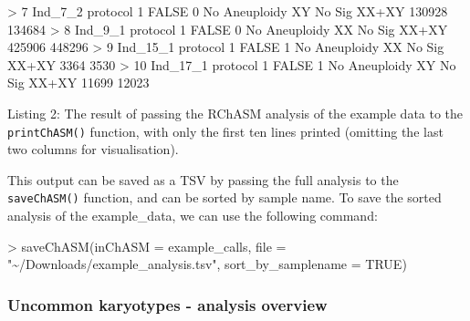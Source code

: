 \documentclass[
  letterpaper,
  DIV=11,
  numbers=noendperiod]{scrartcl}
\newenvironment{Shaded}{\begin{snugshade}}{\end{snugshade}}
\newcommand{\AttributeTok}[1]{\textcolor[rgb]{0.40,0.45,0.13}{#1}}
\newcommand{\ConstantTok}[1]{\textcolor[rgb]{0.56,0.35,0.01}{#1}}
\newcommand{\DecValTok}[1]{\textcolor[rgb]{0.68,0.00,0.00}{#1}}
\newcommand{\FunctionTok}[1]{\textcolor[rgb]{0.28,0.35,0.67}{#1}}
\newcommand{\NormalTok}[1]{\textcolor[rgb]{0.00,0.23,0.31}{#1}}
\newcommand{\SpecialCharTok}[1]{\textcolor[rgb]{0.37,0.37,0.37}{#1}}
\newcommand{\StringTok}[1]{\textcolor[rgb]{0.13,0.47,0.30}{#1}}
\begin{document}
\begin{Shaded}
\begin{Highlighting}[]
\SpecialCharTok{\textgreater{}}  \DecValTok{7}\NormalTok{ Ind\_7\_2  protocol }\DecValTok{1} \ConstantTok{FALSE}       \DecValTok{0}\NormalTok{ No Aneuploidy  XY       No Sig XX}\SpecialCharTok{+}\NormalTok{XY          }\DecValTok{130928}    \DecValTok{134684}
\SpecialCharTok{\textgreater{}}  \DecValTok{8}\NormalTok{ Ind\_9\_1  protocol }\DecValTok{1} \ConstantTok{FALSE}       \DecValTok{0}\NormalTok{ No Aneuploidy  XX       No Sig XX}\SpecialCharTok{+}\NormalTok{XY          }\DecValTok{425906}    \DecValTok{448296}
\SpecialCharTok{\textgreater{}}  \DecValTok{9}\NormalTok{ Ind\_15\_1 protocol }\DecValTok{1} \ConstantTok{FALSE}       \DecValTok{1}\NormalTok{ No Aneuploidy  XX       No Sig XX}\SpecialCharTok{+}\NormalTok{XY            }\DecValTok{3364}      \DecValTok{3530}
\SpecialCharTok{\textgreater{}} \DecValTok{10}\NormalTok{ Ind\_17\_1 protocol }\DecValTok{1} \ConstantTok{FALSE}       \DecValTok{1}\NormalTok{ No Aneuploidy  XY       No Sig XX}\SpecialCharTok{+}\NormalTok{XY           }\DecValTok{11699}     \DecValTok{12023}
\end{Highlighting}
\end{Shaded}

\normalsize

Listing 2: The result of passing the RChASM analysis of the example data
to the \texttt{printChASM()} function, with only the first ten lines
printed (omitting the last two columns for
visualisation)\label{fig:printChasmOutput}.

This output can be saved as a TSV by passing the full analysis to the
\texttt{saveChASM()} function, and can be sorted by sample name. To save
the sorted analysis of the example\_data, we can use the following
command:

\begin{Shaded}
\begin{Highlighting}[]
\SpecialCharTok{\textgreater{}} \FunctionTok{saveChASM}\NormalTok{(}\AttributeTok{inChASM =}\NormalTok{ example\_calls, }
            \AttributeTok{file =} \StringTok{"\textasciitilde{}/Downloads/example\_analysis.tsv"}\NormalTok{, }
            \AttributeTok{sort\_by\_samplename =} \ConstantTok{TRUE}\NormalTok{)}
\end{Highlighting}
\end{Shaded}

\subsubsection{Uncommon karyotypes - analysis
overview}\label{uncommon-karyotypes---analysis-overview}
\end{document}
